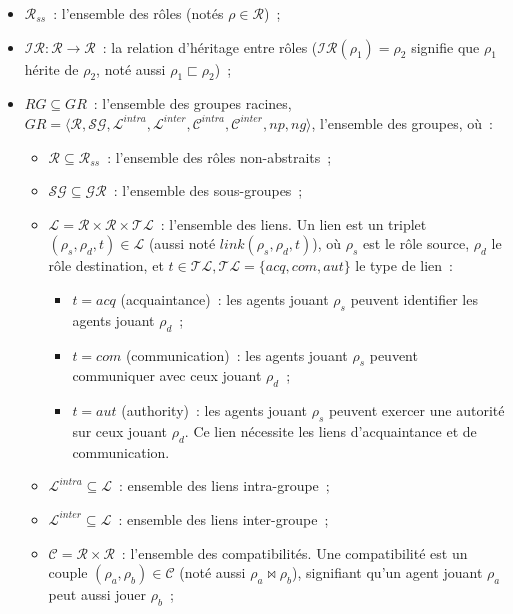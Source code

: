 \begin{itemize}
  \item $\mathcal{R}_{ss}$~: l'ensemble des rôles (notés $\rho \in \mathcal{R}$)~;
  \item $\mathcal{IR}: \mathcal{R} \rightarrow \mathcal{R}$~: la relation d'héritage entre rôles ($\mathcal{IR}(\rho_1) = \rho_2$ signifie que $\rho_1$ hérite de $\rho_2$, noté aussi $\rho_1 \sqsubset \rho_2$)~;
  \item $RG \subseteq GR$~: l'ensemble des groupes racines, $GR = \langle \mathcal{R}, \mathcal{SG}, \mathcal{L}^{intra}, \mathcal{L}^{inter}, \mathcal{C}^{intra}, \mathcal{C}^{inter}, np, ng \rangle$, l'ensemble des groupes, où~:
        \begin{itemize}
          \item $\mathcal{R} \subseteq \mathcal{R}_{ss}$~: l'ensemble des rôles non-abstraits~;
          \item $\mathcal{SG} \subseteq \mathcal{GR}$~: l'ensemble des sous-groupes~;
          \item $\mathcal{L} = \mathcal{R} \times \mathcal{R} \times \mathcal{TL}$~: l'ensemble des liens. Un lien est un triplet $(\rho_s,\rho_d,t) \in \mathcal{L}$ (aussi noté $link(\rho_s,\rho_d,t)$), où $\rho_s$ est le rôle source, $\rho_d$ le rôle destination, et $t \in \mathcal{TL}, \mathcal{TL} = \{acq, com, aut\}$ le type de lien~:
                \begin{itemize}
                  \item $t = acq$ (acquaintance)~: les agents jouant $\rho_s$ peuvent identifier les agents jouant $\rho_d$~;
                  \item $t = com$ (communication)~: les agents jouant $\rho_s$ peuvent communiquer avec ceux jouant $\rho_d$~;
                  \item $t = aut$ (authority)~: les agents jouant $\rho_s$ peuvent exercer une autorité sur ceux jouant $\rho_d$. Ce lien nécessite les liens d'acquaintance et de communication.
                \end{itemize}
          \item $\mathcal{L}^{intra} \subseteq \mathcal{L}$~: ensemble des liens intra-groupe~;
          \item $\mathcal{L}^{inter} \subseteq \mathcal{L}$~: ensemble des liens inter-groupe~;
          \item $\mathcal{C} = \mathcal{R} \times \mathcal{R}$~: l'ensemble des compatibilités. Une compatibilité est un couple $(\rho_a, \rho_b) \in \mathcal{C}$ (noté aussi $\rho_a \bowtie \rho_b$), signifiant qu'un agent jouant $\rho_a$ peut aussi jouer $\rho_b$~;

\end{itemize}
\end{itemize}
